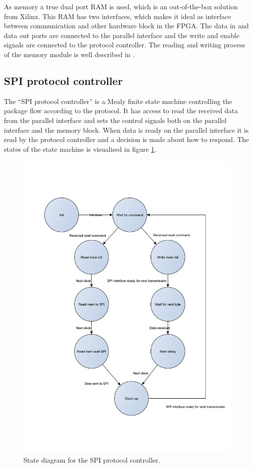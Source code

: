 As memory a true dual port RAM is used, which is an out-of-the-box solution from Xilinx. This RAM has two interfaces, which makes it ideal as interface between communication and other hardware block in the FPGA. The data in and data out ports are connected to the parallel interface and the write and enable signals are connected to the protocol controller. The reading and writing process of the memory module is well described in \cite{XILINX_MEM}.

\subsection{SPI protocol controller}
\label{spi_protocol_controller}
The ``SPI protocol controller'' is a Mealy finite state machine controlling the package flow according to the protocol. It has access to read the received data from the parallel interface and sets the control signals both on the parallel interface and the memory block. When data is ready on the parallel interface it is read by the protocol controller and a decision is made about how to respond. The states of the state machine is visualised in figure \ref{fig:spi_protocol_controller_prettystates}.


\begin{figure}[htb] 
	\centering
	\includegraphics[scale=0.6,clip,trim=0 100 0 100]{graphics/spi_protocol_controller_prettystates.pdf} %
	\caption{State diagram for the SPI protocol controller.}
	\label{fig:spi_protocol_controller_prettystates}
\end{figure}


